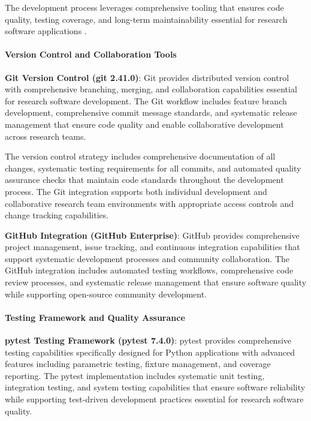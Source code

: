 \documentclass[12pt,a4paper]{report}
\begin{document}
The development process leverages comprehensive tooling that ensures code quality, testing coverage, and long-term
maintainability essential for research software applications .

\paragraph{Version Control and Collaboration Tools}

\textbf{Git Version Control (git 2.41.0)}: Git provides distributed version control with comprehensive branching, merging,
and collaboration capabilities essential for research software development. The Git workflow includes feature branch
development, comprehensive commit message standards, and systematic release management that ensure code quality and
enable collaborative development across research teams.

The version control strategy includes comprehensive documentation of all changes, systematic testing requirements for
all commits, and automated quality assurance checks that maintain code standards throughout the development process. The
Git integration supports both individual development and collaborative research team environments with appropriate
access controls and change tracking capabilities.

\textbf{GitHub Integration (GitHub Enterprise)}: GitHub provides comprehensive project management, issue tracking, and
continuous integration capabilities that support systematic development processes and community collaboration. The
GitHub integration includes automated testing workflows, comprehensive code review processes, and systematic release
management that ensure software quality while supporting open-source community development.

\paragraph{Testing Framework and Quality Assurance}

\textbf{pytest Testing Framework (pytest 7.4.0)}: pytest provides comprehensive testing capabilities specifically designed
for Python applications with advanced features including parametric testing, fixture management, and coverage reporting.
The pytest implementation includes systematic unit testing, integration testing, and system testing capabilities that
ensure software reliability while supporting test-driven development practices essential for research software quality.
\end{document}
